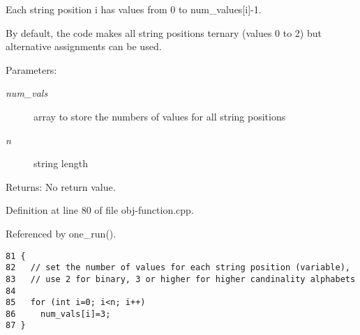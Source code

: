 Each string position i has values from 0 to num\_\-values\mbox{[}i\mbox{]}-1. 

By default, the code makes all string positions ternary (values 0 to 2) but alternative assignments can be used.

\begin{Desc}
\item[Parameters:]
\begin{description}
\item[{\em num\_\-vals}]array to store the numbers of values for all string positions \item[{\em n}]string length\end{description}
\end{Desc}
\begin{Desc}
\item[Returns:]No return value. \end{Desc}


Definition at line 80 of file obj-function.cpp.

Referenced by one\_\-run().

\begin{Code}\begin{verbatim}81 {
82   // set the number of values for each string position (variable),
83   // use 2 for binary, 3 or higher for higher candinality alphabets
84 
85   for (int i=0; i<n; i++)
86     num_vals[i]=3;
87 }
\end{verbatim}\end{Code}


